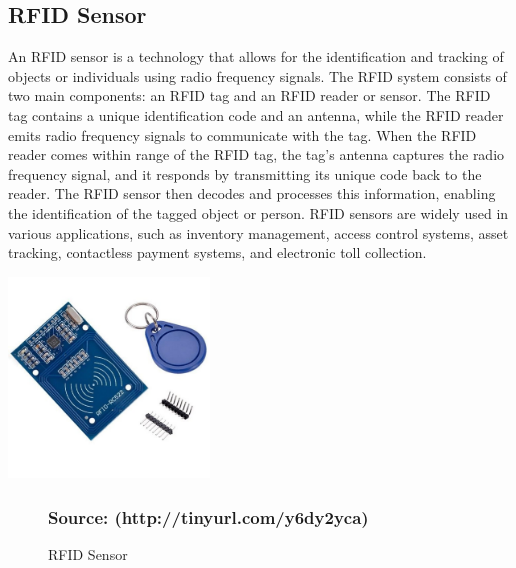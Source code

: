 \documentclass[12pt,a4paper]{report}
\begin{document}
	
	
	
	\subsection{RFID Sensor}
	\begin{justify}
		An RFID  sensor is a technology that allows for the identification and tracking of objects or individuals using radio frequency signals. The RFID system consists of two main components: an RFID tag and an RFID reader or sensor. The RFID tag contains a unique identification code and an antenna, while the RFID reader emits radio frequency signals to communicate with the tag. When the RFID reader comes within range of the RFID tag, the tag's antenna captures the radio frequency signal, and it responds by transmitting its unique code back to the reader. The RFID sensor then decodes and processes this information, enabling the identification of the tagged object or person. RFID sensors are widely used in various applications, such as inventory management, access control systems, asset tracking, contactless payment systems, and electronic toll collection. 
	\end{justify}
	
	\begin{center}
		\includegraphics[width=0.4\textwidth]{images//rfid_sensor.jpg}  \\
		
		
		\begin{figure}[ht]
			
			
			\caption{RFID Sensor}
			
			\subsubsection{Source: (http://tinyurl.com/y6dy2yca)}
		\end{figure}
		
	\end{center}
	
\end{document}
